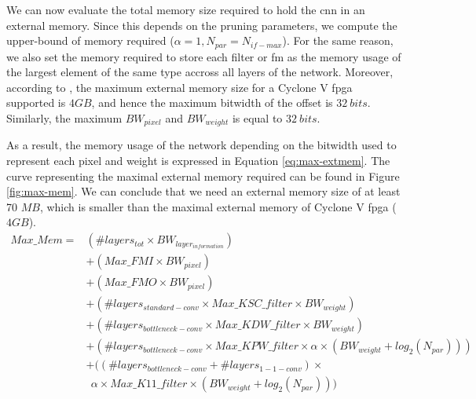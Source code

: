 %
We can now evaluate the total memory size required to hold the \acrshort{cnn} in an external memory. Since this depends on the pruning parameters, we compute the upper-bound of memory required ($\alpha = 1, N_{par} = N_{if-max}$). For the same reason, we also set the memory required to store each filter or \acrshort{fm} as the memory usage of the largest element of the same type accross all layers of the network. Moreover, according to \cite{noauthor_cyclone_2018}, the maximum external memory size for a Cyclone V \acrshort{fpga} supported is $4GB$, and hence the maximum bitwidth of the offset is $32 \ bits$. Similarly, the maximum $BW_{pixel}$ and $BW_{weight}$ is equal to $32 \ bits$.

As a result, the memory usage of the network depending on the bitwidth used to represent each pixel and weight is expressed in Equation \eqref{eq:max-extmem}.
The curve representing the maximal external memory required can be found in Figure \ref{fig:max-mem}. We can conclude that we need an external memory size of at least 70 $MB$, which is smaller than the maximal external memory of Cyclone V \acrshort{fpga} ($4 GB$).
%
\begin{equation}
    \begin{split}
        Max\_Mem = &\left(\# layers_{tot} \times BW_{layer_{information}} \right) \\
        &+ \left( Max\_FMI \times BW_{pixel} \right) \\
        &+ \left( Max\_FMO \times BW_{pixel} \right) \\
        &+ \left( \# layers_{standard-conv} \times Max\_KSC\_filter \times BW_{weight} \right) \\
        &+ \left( \# layers_{bottleneck-conv} \times Max\_KDW\_filter \times BW_{weight} \right)\\
        &+ \left( \# layers_{bottleneck-conv} \times Max\_KPW\_filter \times \alpha \times(BW_{weight} + log_2(N_{par})) \right)\\
        &+ ( \left(\# layers_{bottleneck-conv} + \# layers_{1-1-conv}\right) \times \\
        & \ \ \alpha \times Max\_K11\_filter \times  (BW_{weight} + log_2(N_{par})) )
    \end{split}
\label{eq:max-extmem}
\end{equation}
%
